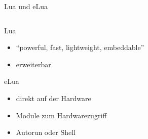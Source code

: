 \documentclass[xcolor=svgnames]{beamer}
\begin{document}
\begin{frame}[fragile]{Lua und eLua}
\begin{columns}[T,totalwidth=0.98\textwidth]
\begin{column}{0.45\textwidth}

\begin{block}{Lua}
\begin{itemize}
\item \enquote{powerful, fast, lightweight, embeddable}
\item erweiterbar
\end{itemize}
\end{block}

\begin{block}{eLua}
\begin{itemize}
\item direkt auf der Hardware
\item Module zum Hardwarezugriff
\item Autorun oder Shell
\end{itemize}
\end{block}
\end{column}

\begin{column}{0.35\textwidth}
\narrowblink 
\end{column}
\end{columns}
\end{frame}
\end{document}
